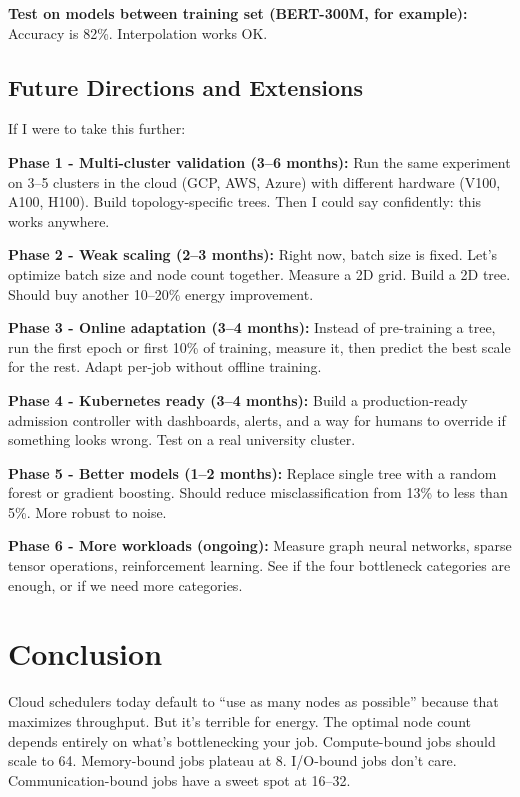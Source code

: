 \documentclass[conference]{IEEEtran}
\begin{document}
\textbf{Test on models between training set (BERT-300M, for example):} Accuracy is 82\%. Interpolation works OK.

\subsection{Future Directions and Extensions}

If I were to take this further:

\textbf{Phase 1 - Multi-cluster validation (3--6 months):} Run the same experiment on 3--5 clusters in the cloud (GCP, AWS, Azure) with different hardware (V100, A100, H100). Build topology-specific trees. Then I could say confidently: this works anywhere.

\textbf{Phase 2 - Weak scaling (2--3 months):} Right now, batch size is fixed. Let's optimize batch size and node count together. Measure a 2D grid. Build a 2D tree. Should buy another 10--20\% energy improvement.

\textbf{Phase 3 - Online adaptation (3--4 months):} Instead of pre-training a tree, run the first epoch or first 10\% of training, measure it, then predict the best scale for the rest. Adapt per-job without offline training.

\textbf{Phase 4 - Kubernetes ready (3--4 months):} Build a production-ready admission controller with dashboards, alerts, and a way for humans to override if something looks wrong. Test on a real university cluster.

\textbf{Phase 5 - Better models (1--2 months):} Replace single tree with a random forest or gradient boosting. Should reduce misclassification from 13\% to less than 5\%. More robust to noise.

\textbf{Phase 6 - More workloads (ongoing):} Measure graph neural networks, sparse tensor operations, reinforcement learning. See if the four bottleneck categories are enough, or if we need more categories.

\section{Conclusion}

Cloud schedulers today default to ``use as many nodes as possible'' because that maximizes throughput. But it's terrible for energy. The optimal node count depends entirely on what's bottlenecking your job. Compute-bound jobs should scale to 64. Memory-bound jobs plateau at 8. I/O-bound jobs don't care. Communication-bound jobs have a sweet spot at 16--32.
\end{document}
